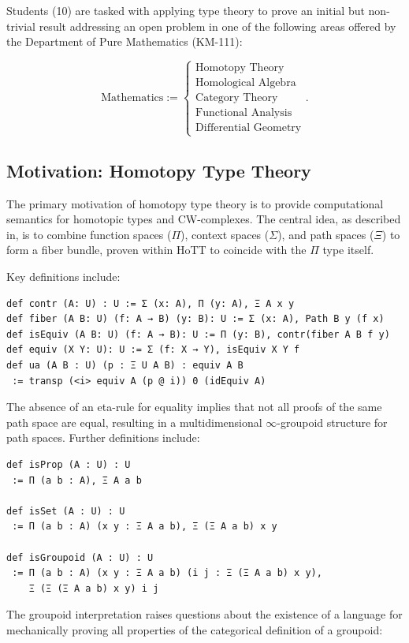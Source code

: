 \documentclass{article}
\begin{document}
Students (10) are tasked with applying type theory to prove an initial
but non-trivial result addressing an open problem in one of the following
areas offered by the Department of Pure Mathematics (KM-111):

\[
\text{Mathematics} :=
\begin{cases}
\text{Homotopy Theory} \\
\text{Homological Algebra} \\
\text{Category Theory} \\
\text{Functional Analysis} \\
\text{Differential Geometry}
\end{cases} .
\]


\newpage
\subsection{Motivation: Homotopy Type Theory}
The primary motivation of homotopy type theory is to provide computational
semantics for homotopic types and CW-complexes. The central idea, as
described in, is to combine function spaces (\(\Pi\)),
context spaces (\(\Sigma\)), and path spaces (\(\Xi\)) to form a fiber bundle, proven within HoTT to coincide with the $\Pi$ type itself.

Key definitions include:

\begin{lstlisting}
def contr (A: U) : U := Σ (x: A), Π (y: A), Ξ A x y
def fiber (A B: U) (f: A → B) (y: B): U := Σ (x: A), Path B y (f x)
def isEquiv (A B: U) (f: A → B): U := Π (y: B), contr(fiber A B f y)
def equiv (X Y: U): U := Σ (f: X → Y), isEquiv X Y f
def ua (A B : U) (p : Ξ U A B) : equiv A B
 := transp (<i> equiv A (p @ i)) 0 (idEquiv A)
\end{lstlisting}

The absence of an eta-rule for equality implies that not all proofs of the
same path space are equal, resulting in a multidimensional \(\infty\)-groupoid
structure for path spaces. Further definitions include:

\begin{lstlisting}
def isProp (A : U) : U
 := Π (a b : A), Ξ A a b

def isSet (A : U) : U
 := Π (a b : A) (x y : Ξ A a b), Ξ (Ξ A a b) x y

def isGroupoid (A : U) : U
 := Π (a b : A) (x y : Ξ A a b) (i j : Ξ (Ξ A a b) x y),
    Ξ (Ξ (Ξ A a b) x y) i j
\end{lstlisting}

The groupoid interpretation raises questions about the existence of a language for
mechanically proving all properties of the categorical definition of a groupoid:
\end{document}
